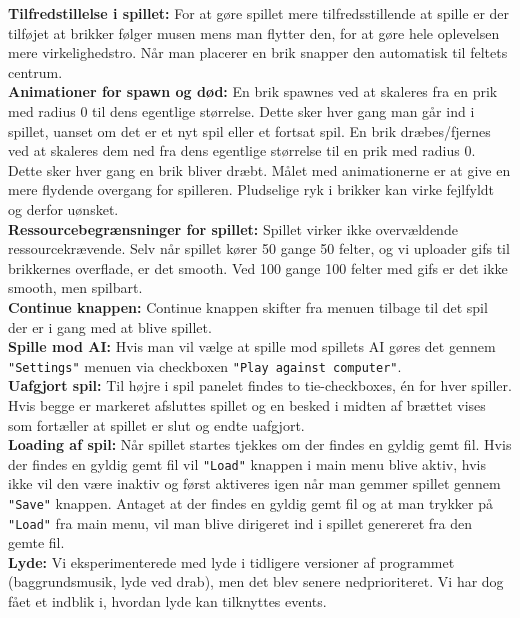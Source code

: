 \textbf{Tilfredstillelse i spillet:} 
For at gøre spillet mere tilfredsstillende at spille er der tilføjet at brikker følger musen mens man flytter den, for at gøre hele oplevelsen mere virkelighedstro. Når man placerer en brik snapper den automatisk til feltets centrum.
\\

\textbf{Animationer for spawn og død:} 
En brik spawnes ved at skaleres fra en prik med radius 0 til dens egentlige størrelse. Dette sker hver gang man går ind i spillet, uanset om det er et nyt spil eller et fortsat spil. En brik dræbes/fjernes ved at skaleres dem ned fra dens egentlige størrelse til en prik med radius 0. Dette sker hver gang en brik bliver dræbt. Målet med animationerne er at give en mere flydende overgang for spilleren. Pludselige ryk i brikker kan virke fejlfyldt og derfor uønsket.\\


\textbf{Ressourcebegrænsninger for spillet:} Spillet virker ikke overvældende ressourcekrævende. Selv når spillet kører 50 gange 50 felter, og vi uploader gifs til brikkernes overflade, er det smooth. Ved 100 gange 100 felter med gifs er det ikke smooth, men spilbart. \\

\textbf{Continue knappen:} Continue knappen skifter fra menuen tilbage til det spil der er i gang med at blive spillet.  \\

\textbf{Spille mod AI:} 
Hvis man vil vælge at spille mod spillets AI gøres det gennem \texttt{"Settings"} menuen via checkboxen \texttt{"Play against computer"}.\\

\textbf{Uafgjort spil:} Til højre i spil panelet findes to tie-checkboxes, én for hver spiller. Hvis begge er markeret afsluttes spillet og en besked i midten af brættet vises som fortæller at spillet er slut og endte uafgjort. \\

\textbf{Loading af spil:}
Når spillet startes tjekkes om der findes en gyldig gemt fil. Hvis der findes en gyldig gemt fil vil \texttt{"Load"} knappen i main menu blive aktiv, hvis ikke vil den være inaktiv og først aktiveres igen når man gemmer spillet gennem \texttt{"Save"} knappen. Antaget at der findes en gyldig gemt fil og at man trykker på \texttt{"Load"} fra main menu, vil man blive dirigeret ind i spillet genereret fra den gemte fil. \\

\textbf{Lyde:} Vi eksperimenterede med lyde i tidligere versioner af programmet (baggrundsmusik, lyde ved drab), men det blev senere nedprioriteret. Vi har dog fået et indblik i, hvordan lyde kan tilknyttes events.